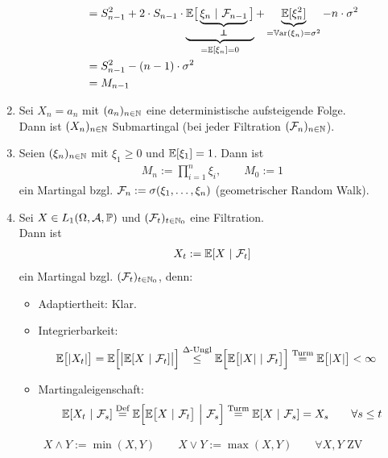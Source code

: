 \begin{beisp}
\begin{enumerate}[label=(\alph*)]
\begin{itemize}
\begin{align*}
				&=S_{n-1}^2+2\cdot S_{n-1}\cdot \underbrace{\E\big[\underbrace{\xi_n~|~\F_{n-1}}_{\unab}\big]}_{=\E[\xi_n]=0}+\underbrace{\E[\xi_n^2]}_{=\Var(\xi_n)=\sigma^2}-n\cdot\sigma^2\\
				&=S_{n-1}^2-(n-1)\cdot\sigma^2\\
				&=M_{n-1}
			\end{align*}
		\end{itemize}
		\item Sei $X_n=a_n$ mit $(a_n)_{n\in\mathbb{N}}$ eine deterministische aufsteigende Folge.\\
		Dann ist $(X_n)_{n\in\mathbb{N}}$ Submartingal (bei jeder Filtration $(\mathcal{F}_n)_{n\in\mathbb{N}}$).
		\item Seien $(\xi_n)_{n\in\mathbb{N}}$ mit $\xi_1\geq0$ und $\mathbb{E}[\xi_1]=1$. Dann ist
		\begin{align*}
			M_n:=\prod\limits_{i=1}^n\xi_i,\qquad M_0:=1
		\end{align*}
		ein Martingal bzgl. $\mathcal{F}_n:=\sigma(\xi_1,\ldots,\xi_n)$ (geometrischer Random Walk).
		\item Sei $X\in L_1(\Omega,\mathcal{A},\mathbb{P})$ und $(\mathcal{F}_t)_{t\in\mathbb{N}_0}$ eine Filtration.\\
		Dann ist
		\begin{align*}
			X_t:=\mathbb{E}[X~|~\mathcal{F}_t]
		\end{align*}
		ein Martingal bzgl. $(\mathcal{F}_t)_{t\in\mathbb{N}_0}$, denn:
		\begin{itemize}
			\item Adaptiertheit: Klar.
			\item Integrierbarkeit:
			\begin{align*}
				\mathbb{E}\big[|X_t|\big]
				=\mathbb{E}\Big[\big|\mathbb{E}[X~|~\mathcal{F}_t]\big|\Big]
				&\stackrel{\Delta\text{-Ungl}}{\leq}
				\mathbb{E}\Big[\mathbb{E}\big[|X|~|~\mathcal{F}_t \big]\Big]
				\stackrel{\text{Turm}}{=}
				\mathbb{E}\big[|X|\big]
				<\infty
			\end{align*}
			\item Martingaleigenschaft:
			\begin{align*}
				\mathbb{E}[X_t~|~\mathcal{F}_s]
				\stackrel{\text{Def}}{=}\mathbb{E}\Big[\mathbb{E}\big[X~|~\mathcal{F}_t\big]~\Big|~ \mathcal{F}_s\Big]
				\stackrel{\text{Turm}}{=}
				\mathbb{E}[X~|~\mathcal{F}_s]
				=X_s
				\qquad\forall s\leq t
			\end{align*}
		\end{itemize}
	\end{enumerate}
\end{beisp}

\begin{notation}
	\begin{align*}
		X\wedge Y:=\min(X,Y)\qquad X\vee Y:=\max(X,Y)\qquad\forall X,Y\text{ ZV}
	\end{align*}
\end{notation}

